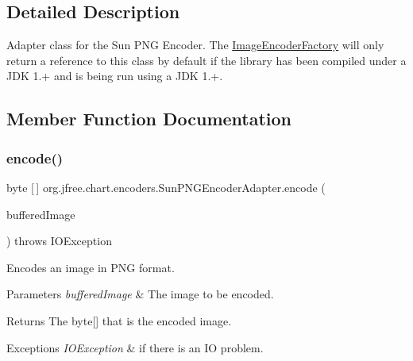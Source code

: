 \subsection{Detailed Description}
Adapter class for the Sun P\+NG Encoder. The \mbox{\hyperlink{classorg_1_1jfree_1_1chart_1_1encoders_1_1_image_encoder_factory}{Image\+Encoder\+Factory}} will only return a reference to this class by default if the library has been compiled under a J\+DK 1.+ and is being run using a J\+DK 1.+. 

\subsection{Member Function Documentation}
\mbox{\label{classorg_1_1jfree_1_1chart_1_1encoders_1_1_sun_p_n_g_encoder_adapter_aabba217aad5303766501a159dfae6b07}} 
\subsubsection{\texorpdfstring{encode()}{encode()}\hspace{0.1cm}{\footnotesize\ttfamily [1/2]}}
{\footnotesize\ttfamily byte \mbox{[}$\,$\mbox{]} org.\+jfree.\+chart.\+encoders.\+Sun\+P\+N\+G\+Encoder\+Adapter.\+encode (\begin{DoxyParamCaption}\item[{Buffered\+Image}]{buffered\+Image }\end{DoxyParamCaption}) throws I\+O\+Exception}

Encodes an image in P\+NG format.


\begin{DoxyParams}{Parameters}
{\em buffered\+Image} & The image to be encoded.\\
\hline
\end{DoxyParams}
\begin{DoxyReturn}{Returns}
The byte\mbox{[}\mbox{]} that is the encoded image.
\end{DoxyReturn}

\begin{DoxyExceptions}{Exceptions}
{\em I\+O\+Exception} & if there is an IO problem. \\
\hline
\end{DoxyExceptions}


